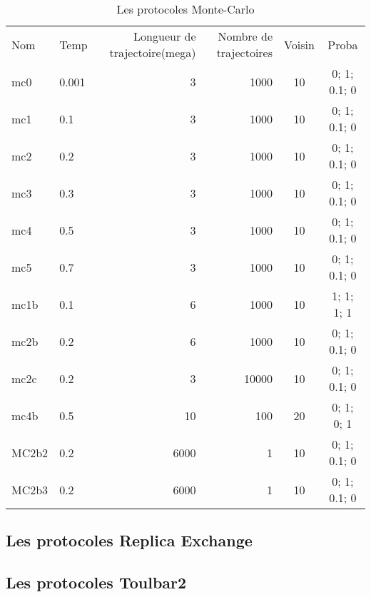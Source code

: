     \begin{table}[!htbp]
      \centering

      \begin{tabular}{llrrcc}

        \toprule
        Nom & Temp & Longueur de trajectoire(mega) & Nombre de trajectoires  & Voisin & Proba \\
        \cmidrule{1-6}
        mc0   & 0.001 &  3  &  1000  & 10 & 0; 1; 0.1; 0   \\      
        mc1   & 0.1   &  3  &  1000  & 10 & 0; 1; 0.1; 0   \\  
        mc2   & 0.2   &  3  &  1000  & 10 & 0; 1; 0.1; 0   \\ 
        mc3   & 0.3   &  3  &  1000  & 10 & 0; 1; 0.1; 0   \\               
        mc4   & 0.5   &  3  &  1000  & 10 & 0; 1; 0.1; 0   \\  
        mc5   & 0.7   &  3  &  1000  & 10 & 0; 1; 0.1; 0   \\  
        mc1b  & 0.1   &  6  &  1000  & 10 & 1; 1;   1; 1   \\  
        mc2b  & 0.2   &  6  &  1000  & 10 & 0; 1; 0.1; 0   \\      
        mc2c  & 0.2   &  3  & 10000  & 10 & 0; 1; 0.1; 0   \\   
        mc4b  & 0.5   & 10  &   100  & 20 & 0; 1;   0; 1   \\
        \cmidrule{1-6}  
        MC2b2 & 0.2   &  6000  &  1  & 10 & 0; 1; 0.1; 0   \\      
        MC2b3 & 0.2   &  6000  &  1  & 10 & 0; 1; 0.1; 0   \\   

        \bottomrule   

        
      \end{tabular}      
      \caption{Les protocoles Monte-Carlo}
\label{tab:protoMC}      
    \end{table}






   \subsection{Les protocoles Replica Exchange}
   \subsection{Les protocoles Toulbar2} 



